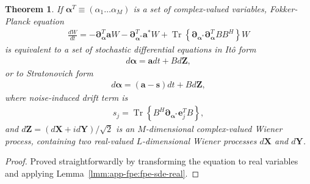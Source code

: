 \documentclass[12pt,aip,jmp,amssymb,amsmath]{revtex4-1}
\newcommand{\Zvec}{\boldsymbol{Z}}
\newcommand{\Trace}[1]{\operatorname{Tr} \left\{ #1 \right\}}
\newcommand{\lmmref}[1]{Lemma~\ref{lmm:#1}}
\newtheorem{theorem}{Theorem}
\begin{document}
\begin{theorem}
\label{thm:app-fpe:fpe-sde-complex}
    If $\boldsymbol{\alpha}^T \equiv (\alpha_1 \ldots \alpha_M)$ is a set of complex-valued variables,
    Fokker-Planck equation
    \begin{equation*}\begin{split}
        \frac{dW}{dt}
        = -\boldsymbol{\partial}_{\boldsymbol{\alpha}}^T \boldsymbol{a} W - \boldsymbol{\partial}_{\boldsymbol{\alpha}^*}^T \boldsymbol{a}^* W
        + \Trace{ \boldsymbol{\partial}_{\boldsymbol{\alpha}^*} \boldsymbol{\partial}_{\boldsymbol{\alpha}}^T B B^H } W
    \end{split}\end{equation*}
    is equivalent to a set of stochastic differential equations in It\^{o} form
    \begin{equation*}\begin{split}
        d\boldsymbol{\alpha} = \boldsymbol{a} dt + B d\Zvec,
    \end{split}\end{equation*}
    or to Stratonovich form
    \begin{equation*}\begin{split}
        d\boldsymbol{\alpha} = (\boldsymbol{a} - \boldsymbol{s}) dt + B d\Zvec,
    \end{split}\end{equation*}
    where noise-induced drift term is
    \begin{equation*}\begin{split}
        s_j = \Trace{ B^H \boldsymbol{\partial}_{\boldsymbol{\alpha}^*} \boldsymbol{e}_j^T B },
    \end{split}\end{equation*}
    and $d\Zvec = (d\boldsymbol{X} + id\boldsymbol{Y}) / \sqrt{2}$ is an $M$-dimensional complex-valued Wiener process,
    containing two real-valued $L$-dimensional Wiener processes $d\boldsymbol{X}$ and $d\boldsymbol{Y}$.
\end{theorem}
\begin{proof}
Proved straightforwardly by transforming the equation to real variables and applying \lmmref{app-fpe:fpe-sde-real}.
\end{proof}
\end{document}
